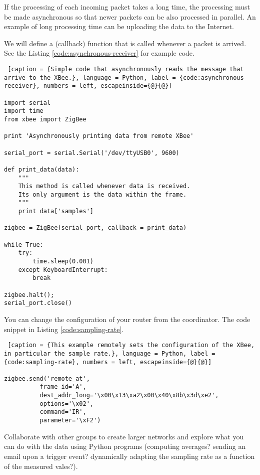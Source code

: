 If the processing of each incoming packet takes a long time, the processing must be made asynchronous so that newer packets can be also processed in parallel.
An example of long processing time can be uploading the data to the Internet.

We will define a (callback) function that is called whenever a packet is arrived.
See the Listing \ref{code:asynchronous-receiver} for example code.

\begin{lstlisting} [caption = {Simple code that asynchronously reads the message that arrive to the XBee.}, language = Python, label = {code:asynchronous-receiver}, numbers = left, escapeinside={@}{@}]

import serial
import time
from xbee import ZigBee

print 'Asynchronously printing data from remote XBee'

serial_port = serial.Serial('/dev/ttyUSB0', 9600)

def print_data(data):
    """
    This method is called whenever data is received.
    Its only argument is the data within the frame.
    """
    print data['samples']

zigbee = ZigBee(serial_port, callback = print_data)

while True:
    try:
        time.sleep(0.001)
    except KeyboardInterrupt:
        break

zigbee.halt();
serial_port.close()

\end{lstlisting}

You can change the configuration of your router from the coordinator. 
The code snippet in Listing \ref{code:sampling-rate}.

\begin{lstlisting} [caption = {This example remotely sets the configuration of the XBee, in particular the sample rate.}, language = Python, label = {code:sampling-rate}, numbers = left, escapeinside={@}{@}]

zigbee.send('remote_at',
          frame_id='A',
          dest_addr_long='\x00\x13\xa2\x00\x40\x8b\x3d\xe2',
          options='\x02',
          command='IR',
          parameter='\xF2')

\end{lstlisting}

Collaborate with other groups to create larger networks and explore what you can do with the data using Python programs (computing averages? sending an email upon a trigger event? dynamically adapting the sampling rate as a function of the measured vales?).

